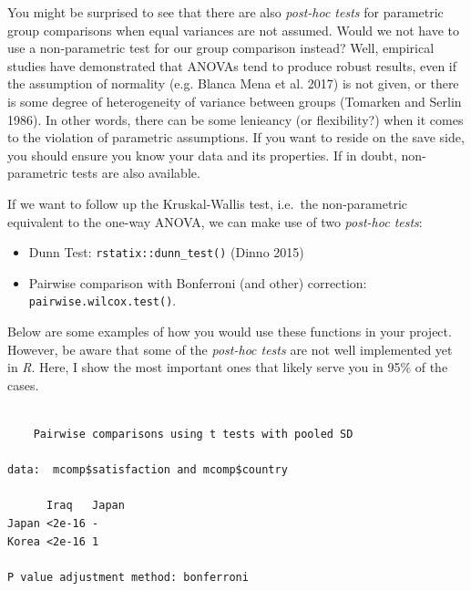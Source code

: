 \documentclass[
  letterpaper,
]{krantz}
\makeatletter
\newenvironment{Shaded}{\begin{snugshade}}{\end{snugshade}}
\newcommand{\AlertTok}[1]{\textcolor[rgb]{0.68,0.00,0.00}{#1}}
\newcommand{\AttributeTok}[1]{\textcolor[rgb]{0.40,0.45,0.13}{#1}}
\newcommand{\CommentTok}[1]{\textcolor[rgb]{0.37,0.37,0.37}{#1}}
\newcommand{\FunctionTok}[1]{\textcolor[rgb]{0.28,0.35,0.67}{#1}}
\newcommand{\NormalTok}[1]{\textcolor[rgb]{0.00,0.23,0.31}{#1}}
\newcommand{\SpecialCharTok}[1]{\textcolor[rgb]{0.37,0.37,0.37}{#1}}
\newcommand{\StringTok}[1]{\textcolor[rgb]{0.13,0.47,0.30}{#1}}
\providecommand{\tightlist}{%
  \setlength{\itemsep}{0pt}\setlength{\parskip}{0pt}}\usepackage{longtable,booktabs,array}
\newenvironment{kframe}{%
\medskip{}
\setlength{\fboxsep}{.8em}
 \def\at@end@of@kframe{}%
 \ifinner\ifhmode%
  \def\at@end@of@kframe{\end{minipage}}%
  \begin{minipage}{\columnwidth}%
 \fi\fi%
 \def\FrameCommand##1{\hskip\@totalleftmargin \hskip-\fboxsep
 \colorbox{shadecolor}{##1}\hskip-\fboxsep
     \hskip-\linewidth \hskip-\@totalleftmargin \hskip\columnwidth}%
 \MakeFramed {\advance\hsize-\width
   \@totalleftmargin\z@ \linewidth\hsize
   \@setminipage}}%
 {\par\unskip\endMakeFramed%
 \at@end@of@kframe}
\renewenvironment{Shaded}{\begin{kframe}}{\end{kframe}}
\makeatother
\begin{document}
You might be surprised to see that there are also \emph{post-hoc tests}
for parametric group comparisons when equal variances are not assumed.
Would we not have to use a non-parametric test for our group comparison
instead? Well, empirical studies have demonstrated that ANOVAs tend to
produce robust results, even if the assumption of normality (e.g. Blanca
Mena et al. 2017) is not given, or there is some degree of heterogeneity
of variance between groups (Tomarken and Serlin 1986). In other words,
there can be some lenieancy (or flexibility?) when it comes to the
violation of parametric assumptions. If you want to reside on the save
side, you should ensure you know your data and its properties. If in
doubt, non-parametric tests are also available.

If we want to follow up the Kruskal-Wallis test, i.e.~the non-parametric
equivalent to the one-way ANOVA, we can make use of two \emph{post-hoc
tests}:

\begin{itemize}
\tightlist
\item
  Dunn Test: \texttt{rstatix::dunn\_test()} (Dinno 2015)
\item
  Pairwise comparison with Bonferroni (and other) correction:
  \texttt{pairwise.wilcox.test()}.
\end{itemize}

Below are some examples of how you would use these functions in your
project. However, be aware that some of the \emph{post-hoc tests} are
not well implemented yet in \emph{R}. Here, I show the most important
ones that likely serve you in 95\% of the cases.

\begin{Shaded}
\end{Shaded}

\begin{verbatim}

    Pairwise comparisons using t tests with pooled SD 

data:  mcomp$satisfaction and mcomp$country 

      Iraq   Japan
Japan <2e-16 -    
Korea <2e-16 1    

P value adjustment method: bonferroni 
\end{verbatim}
\end{document}
